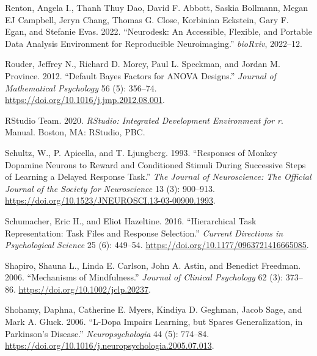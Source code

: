 \documentclass{article}
\newlength{\cslhangindent}
\newlength{\cslentryspacingunit} %
\newenvironment{CSLReferences}[2] %
 {%
  \setlength{\parindent}{0pt}
  \ifodd #1
  \let\oldpar\par
  \def\par{\hangindent=\cslhangindent\oldpar}
  \fi
  \setlength{\parskip}{#2\cslentryspacingunit}
 }%
 {}
\begin{document}
\begin{CSLReferences}{1}{0}
\leavevmode{}%
Renton, Angela I., Thanh Thuy Dao, David F. Abbott, Saskia Bollmann,
Megan EJ Campbell, Jeryn Chang, Thomas G. Close, Korbinian Eckstein,
Gary F. Egan, and Stefanie Evas. 2022. {``Neurodesk: {An} Accessible,
Flexible, and Portable Data Analysis Environment for Reproducible
Neuroimaging.''} \emph{bioRxiv}, 2022--12.

\leavevmode{}%
Rouder, Jeffrey N., Richard D. Morey, Paul L. Speckman, and Jordan M.
Province. 2012. {``Default {Bayes} Factors for {ANOVA} Designs.''}
\emph{Journal of Mathematical Psychology} 56 (5): 356--74.
\url{https://doi.org/10.1016/j.jmp.2012.08.001}.

\leavevmode{}%
RStudio Team. 2020. \emph{{RStudio}: {Integrated} Development
Environment for r}. Manual. {Boston, MA}: {RStudio, PBC.}

\leavevmode{}%
Schultz, W., P. Apicella, and T. Ljungberg. 1993. {``Responses of Monkey
Dopamine Neurons to Reward and Conditioned Stimuli During Successive
Steps of Learning a Delayed Response Task.''} \emph{The Journal of
Neuroscience: The Official Journal of the Society for Neuroscience} 13
(3): 900--913. \url{https://doi.org/10.1523/JNEUROSCI.13-03-00900.1993}.

\leavevmode{}%
Schumacher, Eric H., and Eliot Hazeltine. 2016. {``Hierarchical {Task
Representation}: {Task Files} and {Response Selection}.''} \emph{Current
Directions in Psychological Science} 25 (6): 449--54.
\url{https://doi.org/10.1177/0963721416665085}.

\leavevmode{}%
Shapiro, Shauna L., Linda E. Carlson, John A. Astin, and Benedict
Freedman. 2006. {``Mechanisms of Mindfulness.''} \emph{Journal of
Clinical Psychology} 62 (3): 373--86.
\url{https://doi.org/10.1002/jclp.20237}.

\leavevmode{}%
Shohamy, Daphna, Catherine E. Myers, Kindiya D. Geghman, Jacob Sage, and
Mark A. Gluck. 2006. {``L-Dopa Impairs Learning, but Spares
Generalization, in {Parkinson}'s Disease.''} \emph{Neuropsychologia} 44
(5): 774--84.
\url{https://doi.org/10.1016/j.neuropsychologia.2005.07.013}.


\end{CSLReferences}
\end{document}
